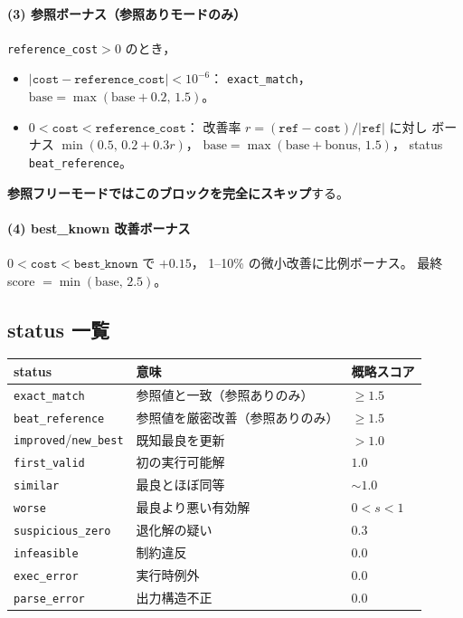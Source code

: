 \documentclass[uplatex,dvipdfmx,a4paper,11pt]{jsarticle}
\begin{document}
\paragraph{(3) 参照ボーナス（参照ありモードのみ）}
\texttt{reference\_cost}$>0$ のとき，
\begin{itemize}
  \item $|\texttt{cost}-\texttt{reference\_cost}|<10^{-6}$：
    \texttt{exact\_match}，$\text{base}=\max(\text{base}+0.2,\,1.5)$。
  \item $0<\texttt{cost}<\texttt{reference\_cost}$：
    改善率 $r=(\texttt{ref}-\texttt{cost})/|\texttt{ref}|$ に対し
    ボーナス $\min(0.5,\,0.2+0.3r)$，
    $\text{base}=\max(\text{base}+\text{bonus},\,1.5)$，
    status \texttt{beat\_reference}。
\end{itemize}
\textbf{参照フリーモードではこのブロックを完全にスキップ}する。

\paragraph{(4) best\_known 改善ボーナス}
$0<\texttt{cost}<\texttt{best\_known}$ で $+0.15$，
1--10\% の微小改善に比例ボーナス。
最終 score $=\min(\text{base},\,2.5)$。

\subsection{status 一覧}

\begin{center}
\begin{tabular}{lll}
  \toprule
  status & 意味 & 概略スコア \\
  \midrule
  \texttt{exact\_match} & 参照値と一致（参照ありのみ） & $\geq 1.5$ \\
  \texttt{beat\_reference} & 参照値を厳密改善（参照ありのみ） & $\geq 1.5$ \\
  \texttt{improved}/\texttt{new\_best} & 既知最良を更新 & $>1.0$ \\
  \texttt{first\_valid} & 初の実行可能解 & $1.0$ \\
  \texttt{similar} & 最良とほぼ同等 & $\sim 1.0$ \\
  \texttt{worse} & 最良より悪い有効解 & $0<s<1$ \\
  \texttt{suspicious\_zero} & 退化解の疑い & $0.3$ \\
  \texttt{infeasible} & 制約違反 & $0.0$ \\
  \texttt{exec\_error} & 実行時例外 & $0.0$ \\
  \texttt{parse\_error} & 出力構造不正 & $0.0$ \\
  \bottomrule
\end{tabular}
\end{center}
\end{document}
